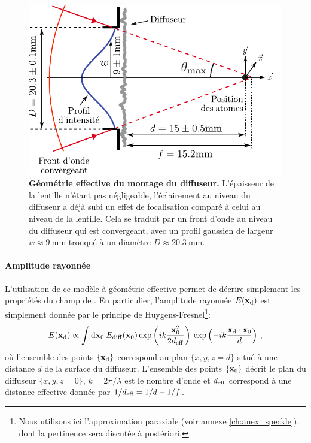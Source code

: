 \begin{figure}
\centering
\includegraphics[scale=0.9]{Fig/Speckle/geometrie_effective_speckle.pdf}
\caption{\textbf{Géométrie effective du montage du diffuseur.} L'épaisseur de la lentille n'étant pas négligeable, l'éclairement au niveau du diffuseur a déjà subi un effet de focalisation comparé à celui au niveau de la lentille. Cela se traduit par un front d'onde au niveau du diffuseur qui est convergeant, avec un profil gaussien de largeur $w\approx\SI{9}{\milli\metre}$ tronqué à un diamètre $D\approx\SI{20.3}{\milli\metre}$.}
\label{fig:geometrie_effective_speckle}
\end{figure}


\paragraph*{Amplitude rayonnée}
L'utilisation de ce modèle à géométrie effective permet de décrire simplement les propriétés du champ de \speckle . En particulier, l'amplitude rayonnée $E(\mathbf{x}_{\mathrm{d}})$ est simplement donnée par le principe de Huygens-Fresnel\footnote{Nous utilisons ici l'approximation paraxiale (voir annexe \ref{ch:anex_speckle}), dont la pertinence sera discutée à postériori.}:
\begin{equation}
E(\mathbf{x}_{\mathrm{d}}) \propto \int{\mathrm{d}\mathbf{x}_0\: E_{\mathrm{diff}}(\mathbf{x}_0) \exp{\left( ik\frac{\mathbf{x}_0^2}{2d_{\mathrm{eff}}} \right) } \: \exp{\left( -ik \frac{\mathbf{x}_{\mathrm{d}}\cdot \mathbf{x}_0}{d} \right) } } \text{ ,}
\label{eq:amplitude_rayonnee}
\end{equation}
où l'ensemble des points $\lbrace\mathbf{x}_{\mathrm{d}}\rbrace$ correspond au plan $\lbrace x,y,z=d \rbrace$ situé à une distance $d$ de la surface du diffuseur. L'ensemble des points $\lbrace\mathbf{x}_0\rbrace$ décrit le plan du diffuseur $\lbrace x,y,z=0 \rbrace$, $k=2\pi/\lambda$ est le nombre d'onde et $d_{\mathrm{eff}}$ correspond à une distance effective donnée par $1/d_{\mathrm{eff}}=1/d-1/f$.

